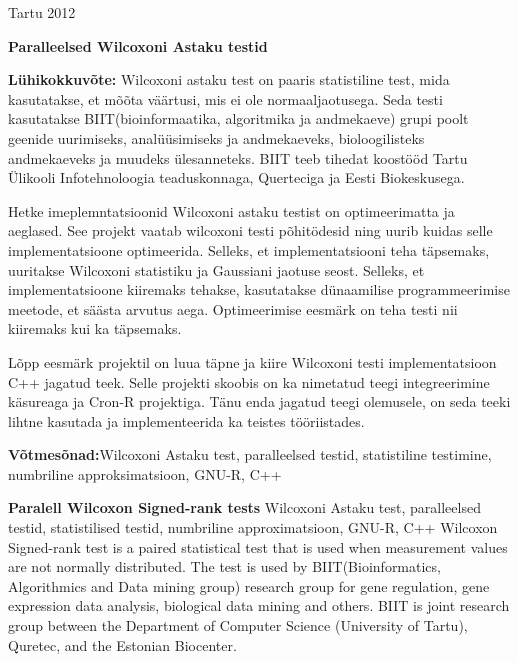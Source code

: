 \documentclass[12pt]{article}
\begin{document}
\vfill
\centerline{Tartu 2012}

\newpage
\thispagestyle{empty}
\phantom{Text to fill the page}

\newpage

\noindent\textbf{\large Paralleelsed Wilcoxoni Astaku testid}
\vspace*{3ex}

\noindent\textbf{Lühikokkuvõte:}
Wilcoxoni astaku test on paaris statistiline test, mida kasutatakse, et mõõta väärtusi, mis ei ole normaaljaotusega. Seda testi kasutatakse BIIT(bioinformaatika, algoritmika ja andmekaeve) grupi poolt geenide uurimiseks, analüüsimiseks ja andmekaeveks, bioloogilisteks andmekaeveks ja muudeks ülesanneteks. BIIT teeb tihedat koostööd Tartu Ülikooli Infotehnoloogia teaduskonnaga, Querteciga ja Eesti Biokeskusega.

Hetke imeplemntatsioonid Wilcoxoni astaku testist on optimeerimatta ja aeglased. See projekt vaatab wilcoxoni testi põhitödesid ning uurib kuidas selle implementatsioone optimeerida. Selleks, et implementatsiooni teha täpsemaks, uuritakse Wilcoxoni statistiku ja Gaussiani jaotuse seost. Selleks, et implementatsioone kiiremaks tehakse, kasutatakse dünaamilise programmeerimise meetode, et säästa arvutus aega. Optimeerimise eesmärk on teha testi nii kiiremaks kui ka täpsemaks.

Lõpp eesmärk projektil on luua täpne ja kiire Wilcoxoni testi implementatsioon C++ jagatud teek. Selle projekti skoobis on ka nimetatud teegi integreerimine käsureaga ja Cron-R projektiga. Tänu enda jagatud teegi olemusele, on seda teeki lihtne kasutada ja implementeerida ka teistes tööriistades.
\vspace*{3ex}

\noindent\textbf{Võtmesõnad:}{Wilcoxoni Astaku test, paralleelsed testid, statistiline testimine, numbriline approksimatsioon, GNU-R, C++}
\vspace*{6ex}

\noindent\textbf{\large Paralell Wilcoxon Signed-rank tests}
\vspace*{3ex}
{Wilcoxoni Astaku test, paralleelsed testid, statistilised testid, numbriline approximatsioon, GNU-R, C++}
Wilcoxon Signed-rank test is a paired statistical test that is used when measurement values are not normally distributed. The test is used by BIIT(Bioinformatics, Algorithmics and Data mining group) research group for gene regulation, gene expression data analysis, biological data mining and others. BIIT is joint research group between the Department of Computer Science (University of Tartu), Quretec, and the Estonian Biocenter.
\end{document}
